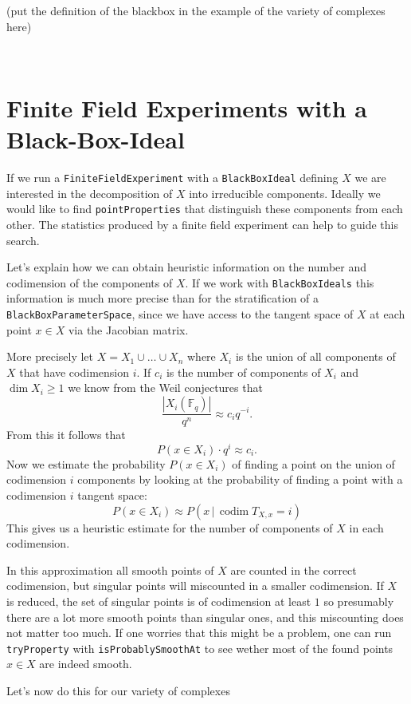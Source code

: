 \documentclass[12pt,a4paper]{amsart}
\theoremstyle{plain}
\theoremstyle{definition}
\newcommand{\FF}{\mathbb F}
\DeclareMathOperator{\codim}{codim}
\begin{document}
{\color{red} (put the definition of the blackbox in the example of the variety of complexes here)}

\



\section{Finite Field Experiments with a Black-Box-Ideal}

If we run a {\tt FiniteFieldExperiment} with a {\tt BlackBoxIdeal}  defining $X$ we are interested in the decomposition of $X$ into irreducible components. Ideally we would like to find {\tt pointProperties} that distinguish these components from each other. The statistics produced by a finite field experiment can help to guide this search. 

Let's explain how we can obtain heuristic information on the number and codimension of the components of $X$. If we work with {\tt BlackBoxIdeals} this information is much more precise than for the stratification of a {\tt BlackBox\-ParameterSpace}, since we have access to the tangent space of $X$ at each point $x \in X$ via the Jacobian matrix. 

More precisely let $X = X_1 \cup \dots \cup X_n$ where $X_i$ is the union of all components of $X$ that have codimension $i$. If $c_i$ is the number of components of $X_i$ and $\dim X_i \ge 1$ we know from the Weil conjectures that
\[
	\frac{|X_i(\FF_q) |}{q^n} \approx c_i q^{-i}.
\]
From this it follows that
\[
	P(x \in X_i) \cdot q^i \approx c_i.
\]
Now we estimate the probability $P(x \in X_i)$ of finding a point on the union of codimension $i$ components by looking at the probability of finding a point with a codimension $i$ tangent space:
\[
	P(x \in X_i) \approx P(x \, | \, \codim T_{X,x} = i )
\]
This gives us a heuristic estimate for the number of components of $X$ in each codimension.

In this approximation all smooth points of $X$ are counted in the correct codimension, but singular points will miscounted in a smaller codimension. If $X$ is reduced, the set of singular points is of codimension at least $1$ so presumably there are a lot more smooth points than singular ones, and this miscounting does not matter too much. If one worries that this might be a problem, one can run {\tt tryProperty} with {\tt isProbablySmoothAt} to see wether most of the found points $x \in  X$ are indeed smooth. 

Let's now do this for our variety of complexes
\end{document}
